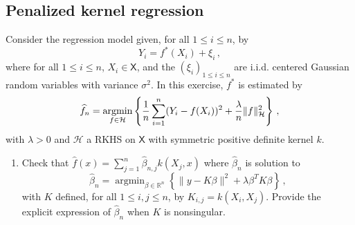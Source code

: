 \documentclass[a4paper,10pt,fleqn]{article}
\newcommand{\eqsp}{\,}
\newcommand{\R}{\ensuremath{\mathbb{R}}}
\newcommand{\1}{\ensuremath{\mathbbm{1}}}
\newcommand{\argmin}{\mathop{\textrm{argmin}}}
\begin{document}
\subsection*{Penalized kernel regression}
Consider the regression model given, for all $1\leqslant i\leqslant n$, by
$$
Y_{i}=f^*(X_{i})+\xi_{i}\eqsp,
$$
where for all $1\leqslant i\leqslant n$, $X_i\in\mathsf{X}$, and the $(\xi_{i})_{1\leqslant i \leqslant n}$ are i.i.d. centered Gaussian random variables with variance $\sigma^2$. In this exercise, $f^*$ is estimated by
$$
\widehat f_n=\argmin_{f\in\mathcal{H}}\left\{{1\over n}\sum_{i=1}^n(Y_{i}-f(X_{i}))^2+{\lambda\over n} \|f\|_{\mathcal{H}}^2\right\}\eqsp,
$$
with $\lambda>0$  and $\mathcal{H}$  a RKHS on $\mathsf{X}$ with symmetric positive definite kernel $k$.
\begin{enumerate}
\item Check that $\widehat f(x)=\sum_{j=1}^n\widehat \beta_{n,j}k(X_{j},x)$ where $\widehat \beta_n$ is solution to
$$
\widehat \beta_n =\argmin_{\beta\in\R^n}\left\{\|y-K\beta\|^2+{\lambda} \beta^TK\beta\right\}\eqsp,
$$
with $K$ defined, for all $1\leqslant i,j\leqslant n$, by $K_{i,j}=k (X_{i},X_{j})$.  Provide the explicit expression of $\widehat \beta_n$ when $K$ is nonsingular.

\vspace{.2cm}


\end{enumerate}
\end{document}
